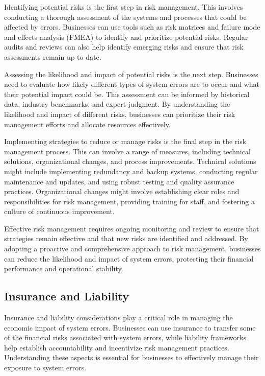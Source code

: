 \documentclass[10pt, conference, letterpaper]{IEEEtran}
\begin{document}
Identifying potential risks is the first step in risk management. This involves conducting a thorough assessment of the systems and processes that could be affected by errors. Businesses can use tools such as risk matrices and failure mode and effects analysis (FMEA) to identify and prioritize potential risks. Regular audits and reviews can also help identify emerging risks and ensure that risk assessments remain up to date.

Assessing the likelihood and impact of potential risks is the next step. Businesses need to evaluate how likely different types of system errors are to occur and what their potential impact could be. This assessment can be informed by historical data, industry benchmarks, and expert judgment. By understanding the likelihood and impact of different risks, businesses can prioritize their risk management efforts and allocate resources effectively.

Implementing strategies to reduce or manage risks is the final step in the risk management process. This can involve a range of measures, including technical solutions, organizational changes, and process improvements. Technical solutions might include implementing redundancy and backup systems, conducting regular maintenance and updates, and using robust testing and quality assurance practices. Organizational changes might involve establishing clear roles and responsibilities for risk management, providing training for staff, and fostering a culture of continuous improvement.

Effective risk management requires ongoing monitoring and review to ensure that strategies remain effective and that new risks are identified and addressed. By adopting a proactive and comprehensive approach to risk management, businesses can reduce the likelihood and impact of system errors, protecting their financial performance and operational stability.

\subsection{Insurance and Liability}
Insurance and liability considerations play a critical role in managing the economic impact of system errors. Businesses can use insurance to transfer some of the financial risks associated with system errors, while liability frameworks help establish accountability and incentivize risk management practices. Understanding these aspects is essential for businesses to effectively manage their exposure to system errors.
\end{document}
